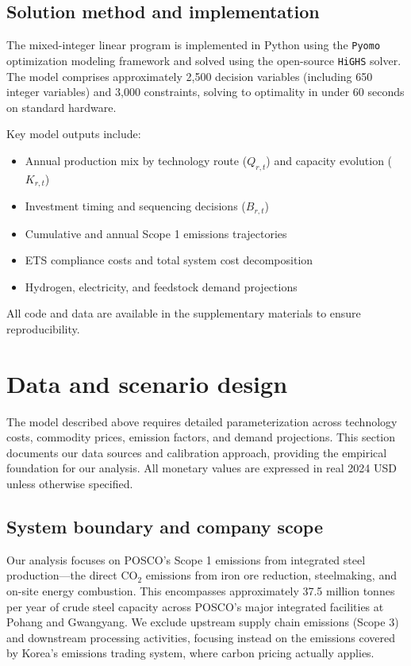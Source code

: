 \documentclass[preprint,1p,authoryear]{elsarticle}
\begin{document}
\subsection{Solution method and implementation}

The mixed-integer linear program is implemented in Python using the \texttt{Pyomo} optimization modeling framework and solved using the open-source \texttt{HiGHS} solver. The model comprises approximately 2,500 decision variables (including 650 integer variables) and 3,000 constraints, solving to optimality in under 60 seconds on standard hardware.

Key model outputs include:
\begin{itemize}[leftmargin=*]
  \item Annual production mix by technology route ($Q_{r,t}$) and capacity evolution ($K_{r,t}$)
  \item Investment timing and sequencing decisions ($B_{r,t}$)
  \item Cumulative and annual Scope 1 emissions trajectories
  \item ETS compliance costs and total system cost decomposition
  \item Hydrogen, electricity, and feedstock demand projections
\end{itemize}

All code and data are available in the supplementary materials to ensure reproducibility.

\section{Data and scenario design}

The model described above requires detailed parameterization across technology costs, commodity prices, emission factors, and demand projections. This section documents our data sources and calibration approach, providing the empirical foundation for our analysis. All monetary values are expressed in real 2024 USD unless otherwise specified.

\subsection{System boundary and company scope}

Our analysis focuses on POSCO's Scope 1 emissions from integrated steel production—the direct CO$_2$ emissions from iron ore reduction, steelmaking, and on-site energy combustion. This encompasses approximately 37.5 million tonnes per year of crude steel capacity across POSCO's major integrated facilities at Pohang and Gwangyang. We exclude upstream supply chain emissions (Scope 3) and downstream processing activities, focusing instead on the emissions covered by Korea's emissions trading system, where carbon pricing actually applies.
\end{document}
